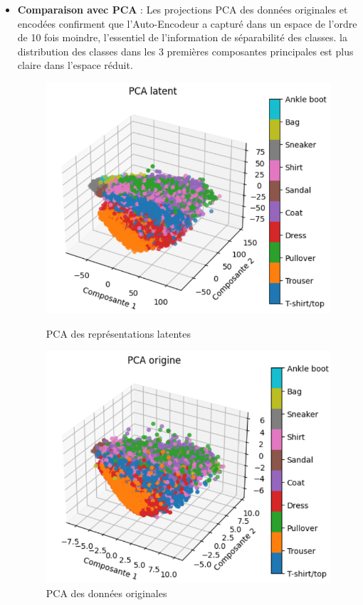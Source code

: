\documentclass[unnumsec,webpdf,modern,large]{projet_manifold}%
\theoremstyle{thmstyleone}%
\theoremstyle{thmstyletwo}%
\theoremstyle{thmstylethree}%
\begin{document}
\begin{itemize}
    \item \textbf{Comparaison avec PCA} : Les projections PCA des données originales et encodées confirment que l'Auto-Encodeur a capturé dans un espace de l'ordre de 10 fois moindre, l'essentiel de l'information de séparabilité des classes. la distribution des classes dans les 3 premières composantes principales est plus claire dans l'espace réduit.
    \begin{figure}[H]
        \centering
        \begin{minipage}[b]{0.45\columnwidth}
            \centering
            \includegraphics[width=\columnwidth]{Fig/pca_latent.png}
            \caption{PCA des représentations latentes}
            \label{fig:pca_latent}
        \end{minipage}
        \hspace{0.05\columnwidth}
        \begin{minipage}[b]{0.45\columnwidth}
            \centering
            \includegraphics[width=\columnwidth]{Fig/pca_origine.png}
            \caption{PCA des données originales}
            \label{fig:pca_origine}
        \end{minipage}
    \end{figure}
\end{itemize}
\end{document}
